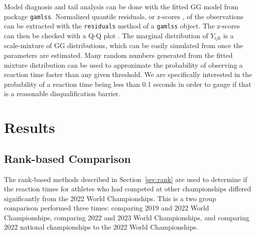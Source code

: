 \documentclass[12pt, letterpaper]{article}
\begin{document}
Model diagnosis and tail analysis can be done with the fitted GG model
from package \texttt{gamlss}. Normalized quantile residuals, or
z-scores \citep{dunn1996randomized}, of the observations can be
extracted with the \texttt{residuals} method of a \texttt{gamlss}
object. The z-scores can then be checked with a Q-Q plot
\citep{almeida2018ggplot2}. The marginal
distribution of $Y_{ijk}$ is a scale-mixture of GG distributions, which can be
easily simulated from once the parameters are estimated. Many
random numbers generated from the fitted mixture distribution can be used to
approximate the probability of observing a reaction time faster than any given
threshold. We are specifically interested in the probability of a reaction time
being less than 0.1 seconds in order to gauge if that is a reasonable 
disqualification barrier.



\section{Results} \label{sec:Results}

\subsection{Rank-based Comparison} \label{subsec:Results_Rank}

The rank-based methods described in Section~\ref{sec:rank} are used
to determine if the reaction times for athletes who had competed at other 
championships differed significantly from the 2022 World Championships. This is
a two group comparison performed three times: comparing 2019 and 2022 World
Championships, comparing 2022 and 2023 World Championships, and comparing 2022 
national championships to the 2022 World Championships.
\end{document}
